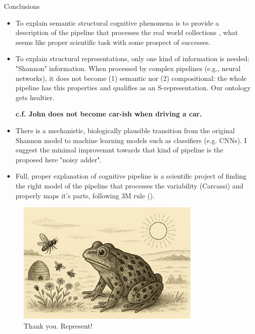 \documentclass[10pt, aspectratio=169, handout]{beamer}
\begin{document}
    
    \begin{frame}{Conclusions }
    
        \begin{itemize}
           \item To explain semantic structural cognitive phenomena is to provide a description of the pipeline that processes the real world collections  ,  what seems like proper scientific task with some prospect of successes.
          
            \item To explain  structural representations, only one kind of information is needed: "Shannon" information. When processed by complex pipelines (e.g., neural networks), it does not become  (1) semantic nor (2) compositional: the whole pipeline has this properties  and qualifies as an S-representation. Our ontology gets healtier. 
            
        \textbf{    c.f. John does not become car-ish when driving a car.}

            \item There is a mechanistic, biologically plausible transition from the original Shannon model to machine learning models such as classifiers (e.g. CNNs). I suggest the minimal improvemnt towards that kind of pipeline is the proposed here "noisy adder".
            
            \item Full, proper explanation of cognitive pipeline is a scientific project of finding the right model of the pipeline that processes the variability (Carcassi) and properly maps it's parts, following 3M rule (\cite{Craver}).
        \end{itemize}
      
    \end{frame}
    



    
    \begin{frame}
        \begin{figure}[h!]
            \centering
            \includegraphics[width=0.8\textwidth]{images/frog_world.png}
            \caption{\Huge Thank you. Represent! }
            
        \end{figure}
      
    \end{frame}
    
\end{document}
